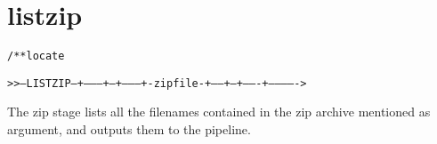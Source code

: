 \section{listzip}
\begin{shaded}
\begin{alltt}
/** locate



   >>--LISTZIP--+---------+--+--------+-zipfile-+-----+--+-------+------------->
               

\end{alltt}
\end{shaded}
The zip stage lists all the filenames contained in the zip archive
mentioned as argument, and outputs them to
the pipeline.
